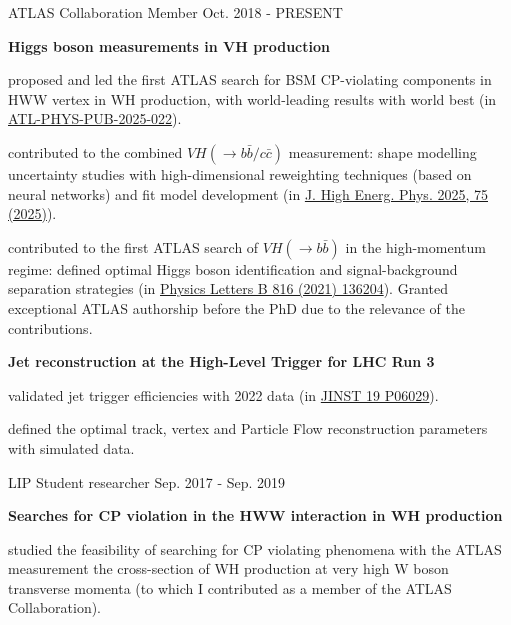 \begin{cventries}
    \cventry
    {ATLAS Collaboration}
    {Member}
    {}
    {Oct. 2018 - PRESENT}
    {
        \textbf{Higgs boson measurements in VH production}\vspace{14pt}
        \begin{cvitems}
            \item {proposed and led the first ATLAS search for BSM CP-violating components in HWW vertex in WH production, with world-leading results with world best (in \href{https://atlas.web.cern.ch/Atlas/GROUPS/PHYSICS/PUBNOTES/ATL-PHYS-PUB-2025-022/}{ATL-PHYS-PUB-2025-022}).}
            \item {contributed to the combined $VH(\to b\bar{b}/c\bar{c})$ measurement: shape modelling uncertainty studies with high-dimensional reweighting techniques (based on neural networks) and fit model development (in \href{https://doi.org/10.1007/JHEP04(2025)075}{J. High Energ. Phys. 2025, 75 (2025)}).}
            \item {contributed to the first ATLAS search of $VH(\to b\bar{b})$ in the high-momentum regime: defined optimal Higgs boson identification and signal-background separation strategies (in \href{https://doi.org/10.1016/j.physletb.2021.136204}{Physics Letters B 816 (2021) 136204}). Granted exceptional ATLAS authorship before the PhD due to the relevance of the contributions.}
        \end{cvitems}\vspace{19pt}
        \textbf{Jet reconstruction at the High-Level Trigger for LHC Run 3}\vspace{14pt}
        \begin{cvitems}
            \item {validated jet trigger efficiencies with 2022 data (in \href{https://doi.org/10.1088/1748-0221/19/06/P06029}{JINST 19 P06029}).}
            \item {defined the optimal track, vertex and Particle Flow reconstruction parameters with simulated data.}
        \end{cvitems}
    }

    \cventry
    {LIP}
    {Student researcher}
    {}
    {Sep. 2017 - Sep. 2019}
    {
        \textbf{Searches for CP violation in the HWW interaction in WH production}\vspace{12pt}
        \begin{cvitems}      
            \item {studied the feasibility of searching for CP violating phenomena with the ATLAS measurement the cross-section of WH production at very high W boson transverse momenta (to which I contributed as a member of the ATLAS Collaboration).}
        \end{cvitems}
    }

\end{cventries}
